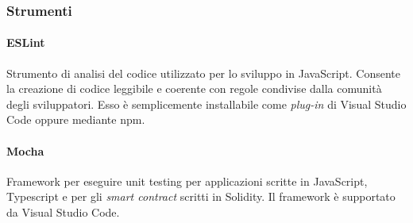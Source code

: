 \subsubsection{Strumenti}
\paragraph{ESLint}
Strumento di analisi del codice utilizzato per lo sviluppo in JavaScript. Consente la creazione di codice leggibile e coerente con regole condivise dalla comunità degli sviluppatori. Esso è semplicemente installabile come \textit{plug-in\glo} di Visual Studio Code oppure mediante npm.

\paragraph{Mocha}
Framework per eseguire unit testing per applicazioni scritte in JavaScript, Typescript e per gli \textit{smart contract\glo} scritti in Solidity. Il framework è supportato da Visual Studio Code.
